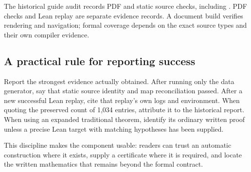 The historical guide audit records PDF and static source checks, including . PDF checks and Lean replay are separate evidence records. A document build verifies rendering and navigation; formal coverage depends on the exact source types and their own compiler evidence.

\subsection{A practical rule for reporting success}

Report the strongest evidence actually obtained. After running only the data generator, say that static source identity and map reconciliation passed. After a new successful Lean replay, cite that replay's own logs and environment. When quoting the preserved count of 1,034 entries, attribute it to the historical report. When using an expanded traditional theorem, identify its ordinary written proof unless a precise Lean target with matching hypotheses has been supplied.

This discipline makes the component usable: readers can trust an automatic construction where it exists, supply a certificate where it is required, and locate the written mathematics that remains beyond the formal contract.
